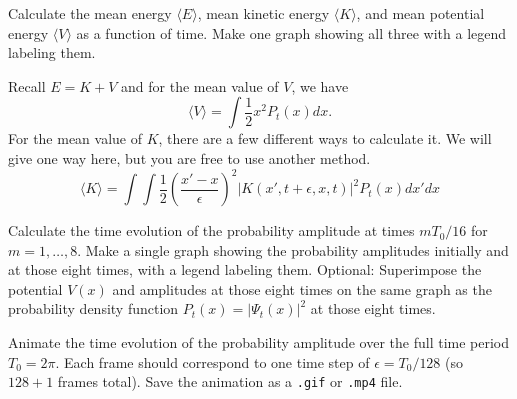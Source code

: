 \begin{solution}
\end{solution}

\begin{problem}[10]
Calculate the mean energy $\langle E \rangle$, mean kinetic energy $\langle K \rangle$, and mean potential energy $\langle V \rangle$ as a function of time.
Make one graph showing all three with a legend labeling them.

\begin{hint}
  Recall $E = K + V$ and for the mean value of $V$, we have
  \begin{equation}
    \langle V\rangle = \int \frac{1}{2}x^2 P_t(x) dx.
  \end{equation}
  For the mean value of $K$, there are a few different ways to calculate it.
  We will give one way here, but you are free to use another method.
  \begin{equation}
    \langle K\rangle = \int \int \frac{1}{2} \left(\frac{x' - x}{\epsilon}\right)^2 |K(x', t+\epsilon, x, t)|^2 P_t(x) dx' dx
  \end{equation}
\end{hint}
\end{problem}

\begin{solution}
\end{solution}

\begin{problem}[10]
Calculate the time evolution of the probability amplitude at times $mT_0/16$ for $m=1, \dots, 8$.
Make a single graph showing the probability amplitudes initially and at those eight times, with a legend labeling them.
Optional: Superimpose the potential $V(x)$ and amplitudes at those eight times on the same graph as the probability density function $P_t(x) = |\Psi_t(x)|^2$ at those eight times.
\end{problem}

\begin{solution}
\end{solution}

\begin{problem}[10]
Animate the time evolution of the probability amplitude over the full time period $T_0 = 2\pi$.
Each frame should correspond to one time step of $\epsilon = T_0/128$ (so $128+1$ frames total).
Save the animation as a \texttt{.gif} or \texttt{.mp4} file.
\end{problem}

\begin{solution}
\end{solution}


